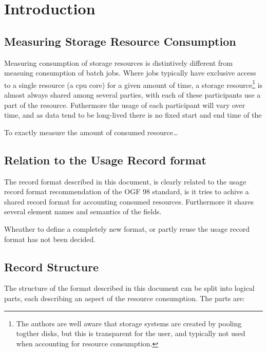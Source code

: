 \section{Introduction}


\subsection{Measuring Storage Resource Consumption}

Measuring consumption of storage resources is distintively different from
measuing consumption of batch jobs. Where jobs typically have exclusive access
to a single resource (a cpu core) for a given amount of time, a storage
resource\footnote{The authors are well aware that storage systems are created
by pooling togther disks, but this is transparent for the user, and typically
not used when accounting for resource consumption.} is almost always shared
among several parties, with each of these participants use a part of the
resource. Futhermore the usage of each participant will vary over time, and as
data tend to be long-lived there is no fixed start and end time of the 

To exactly measure the amount of consumed resource\ldots




\subsection{Relation to the Usage Record format}

The record format described in this document, is clearly related to the usage
record format recommendation of the OGF 98 standard, is it tries to achive a
shared record format for accounting consumed resources. Furthermore it shares
several element names and semantics of the fields.

Wheather to define a completely new format, or partly reuse the usage record
format has not been decided.


\subsection{Record Structure}

The structure of the format described in this document can be split into
logical parts, each describing an aspect of the resource consumption. The parts
are:

